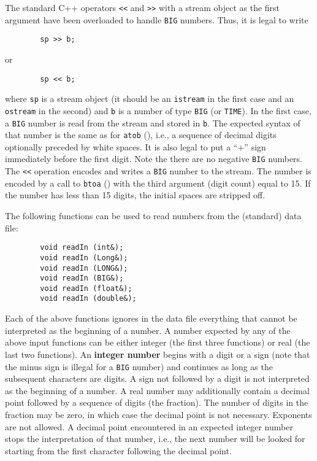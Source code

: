The standard C++ operators {\tt <<} and {\tt >>} with a stream object as the
first argument have been overloaded to handle {\tt BIG} numbers.
Thus, it is legal to write
\begin{verbatim}
        sp >> b;
\end{verbatim}
or
\begin{verbatim}
        sp << b;
\end{verbatim}
where {\tt sp} is a stream object (it should be an {\tt istream} in the
first case and an {\tt ostream} in the second) and {\tt b} is a number of type
{\tt BIG} (or {\tt TIME}).
In the first case, a {\tt BIG} number is read from the stream and stored in
{\tt b}.
The expected syntax of that number is the same as for {\tt atob}
(), i.e., a sequence of decimal digits optionally
preceded by white spaces.
It is also legal to put a ``+'' sign  immediately before the first digit.
Note the there are no negative {\tt BIG} numbers.
The {\tt <<} operation encodes and writes a {\tt BIG} number to the stream.
The number is encoded by a call to {\tt btoa} () with the third
argument (digit count) equal to 15.
If the number has less than 15 digits, the initial spaces are stripped off.

The following functions can be used to read numbers from the (standard)
data file:
\begin{verbatim}
        void readIn (int&);
        void readIn (Long&);
        void readIn (LONG&);
        void readIn (BIG&);
        void readIn (float&);
        void readIn (double&);
\end{verbatim}

Each of the above functions ignores in the data file everything that
cannot be interpreted as the beginning of a number.
A number expected by any of the above input functions can be either integer
(the first three functions) or real (the last two functions).
An {\bf integer number} begins with a digit or a sign
(note that the minus sign is illegal for a {\tt BIG} number)
and continues as long as the subsequent characters are digits.
A sign not followed by a digit is not interpreted as the beginning of a number.
A real number may additionally contain a decimal
point followed by a sequence of digits (the fraction).
The number of digits in the fraction may
be zero, in which case the decimal point is not necessary.
Exponents are not allowed.
A decimal point encountered in an expected integer number
stops the interpretation
of that number, i.e., the next number will be looked for starting from the first
character following the decimal point.

